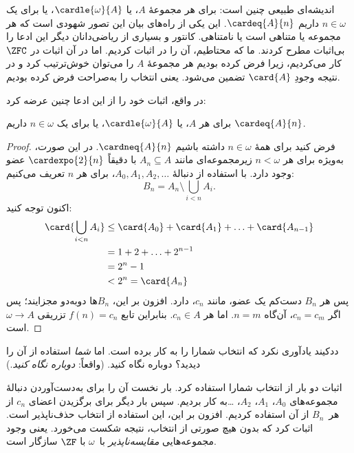 \documentclass[../../../include/open-logic-section]{subfiles}
\begin{document}
\begin{ex}
اندیشه‌ای طبیعی چنین است: برای هر مجموعهٔ $A$، یا
$\cardle{\omega}{A}$، یا برای یک $n \in \omega$ داریم
$\cardeq{A}{n}$. این یکی از راه‌های بیان این تصور شهودی است که هر
مجموعه یا متناهی است یا نامتناهی. کانتور و بسیاری از ریاضی‌دانان
دیگر این ادعا را بی‌اثبات مطرح کردند. ما که محتاطیم، آن را در
 اثبات کردیم.
اما در آن اثبات در $\ZFC$ کار می‌کردیم، زیرا فرض کرده بودیم هر
مجموعهٔ $A$ را می‌توان خوش‌ترتیب کرد و در نتیجه وجودِ $\card{A}$
تضمین می‌شود. یعنی انتخاب را به‌صراحت فرض کرده بودیم.

در واقع، \citet{Dedekind1888} اثبات خود را از این ادعا چنین عرضه
کرد:

\begin{thm}
برای هر $A$، یا $\cardle{\omega}{A}$، یا برای یک
$n \in \omega$ داریم $\cardeq{A}{n}$.
\end{thm}

\begin{proof}
فرض کنید برای همهٔ $n \in \omega$ داشته باشیم
$\cardneq{A}{n}$. در این صورت، به‌ویژه برای هر $n < \omega$
زیرمجموعه‌ای مانند $A_n \subseteq A$ با دقیقاً
$\cardexpo{2}{n}$ عضو وجود دارد. با استفاده از دنبالهٔ
$A_0, A_1, A_2, \ldots$، برای هر $n$ تعریف می‌کنیم:
\[
	B_n = A_n \setminus \bigcup_{i < n} A_i.
\]
اکنون توجه کنید:
\begin{align*}
	\card{\bigcup_{i < n}A_i}
	&\leq \card{A_0} + \card{A_1} + \ldots + \card{A_{n-1}}\\
	&=1 + 2 + \ldots + 2^{n-1}\\
	& = 2^n - 1\\
	& < 2^n = \card{A_n}
\end{align*}
پس هر $B_n$ دست‌کم یک عضو، مانند $c_n$، دارد. افزون بر این،
$B_n$ها دوبه‌دو مجزایند؛ پس اگر $c_n = c_m$، آن‌گاه $n = m$.
اما هر $c_n \in A$. بنابراین تابع $f(n) = c_n$ تزریقی
$\omega \to A$ است.
\end{proof}
\noindent
ددکیند یادآوری نکرد که انتخاب شمارا را به کار برده است. اما
\emph{شما} استفاده از آن را دیدید؟ دوباره نگاه کنید. (واقعاً:
\emph{دوباره نگاه کنید}.)

اثبات دو بار از انتخاب شمارا استفاده کرد. بار نخست آن را برای
به‌دست‌آوردن دنبالهٔ مجموعه‌های
$A_0$، $A_1$، $A_2$، \dots\@ به کار بردیم. سپس بار دیگر برای
برگزیدن اعضای $c_n$ از هر~$B_n$ از آن استفاده کردیم. افزون بر این،
این استفاده از انتخاب حذف‌ناپذیر است. \citet[p.~138]{Cohen1966}
اثبات کرد که بدون هیچ صورتی از انتخاب، نتیجه شکست می‌خورد. یعنی
وجود مجموعه‌هایی \emph{مقایسه‌ناپذیر} با~$\omega$ با $\ZF$ سازگار
است.
\end{ex}
\end{document}
